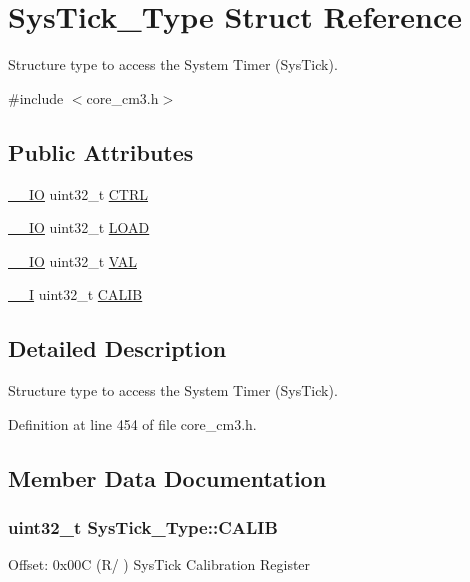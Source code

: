 \hypertarget{struct_sys_tick___type}{\section{\-Sys\-Tick\-\_\-\-Type \-Struct \-Reference}
\label{struct_sys_tick___type}
}


\-Structure type to access the \-System \-Timer (\-Sys\-Tick).  




{\ttfamily \#include $<$core\-\_\-cm3.\-h$>$}

\subsection*{\-Public \-Attributes}
\begin{DoxyCompactItemize}
\item 
\hyperlink{group___c_m_s_i_s__core__definitions_gaec43007d9998a0a0e01faede4133d6be}{\-\_\-\-\_\-\-I\-O} uint32\-\_\-t \hyperlink{struct_sys_tick___type_af2ad94ac83e5d40fc6e34884bc1bec5f}{\-C\-T\-R\-L}
\item 
\hyperlink{group___c_m_s_i_s__core__definitions_gaec43007d9998a0a0e01faede4133d6be}{\-\_\-\-\_\-\-I\-O} uint32\-\_\-t \hyperlink{struct_sys_tick___type_ae7bc9d3eac1147f3bba8d73a8395644f}{\-L\-O\-A\-D}
\item 
\hyperlink{group___c_m_s_i_s__core__definitions_gaec43007d9998a0a0e01faede4133d6be}{\-\_\-\-\_\-\-I\-O} uint32\-\_\-t \hyperlink{struct_sys_tick___type_a0997ff20f11817f8246e8f0edac6f4e4}{\-V\-A\-L}
\item 
\hyperlink{group___c_m_s_i_s__core__definitions_gaf63697ed9952cc71e1225efe205f6cd3}{\-\_\-\-\_\-\-I} uint32\-\_\-t \hyperlink{struct_sys_tick___type_a9c9eda0ea6f6a7c904d2d75a6963e238}{\-C\-A\-L\-I\-B}
\end{DoxyCompactItemize}


\subsection{\-Detailed \-Description}
\-Structure type to access the \-System \-Timer (\-Sys\-Tick). 

\-Definition at line 454 of file core\-\_\-cm3.\-h.



\subsection{\-Member \-Data \-Documentation}
\hypertarget{struct_sys_tick___type_a9c9eda0ea6f6a7c904d2d75a6963e238}{
\subsubsection[{\-C\-A\-L\-I\-B}]{ uint32\-\_\-t {\bf \-Sys\-Tick\-\_\-\-Type\-::\-C\-A\-L\-I\-B}}}\label{struct_sys_tick___type_a9c9eda0ea6f6a7c904d2d75a6963e238}
\-Offset\-: 0x00\-C (\-R/ ) \-Sys\-Tick \-Calibration \-Register 

